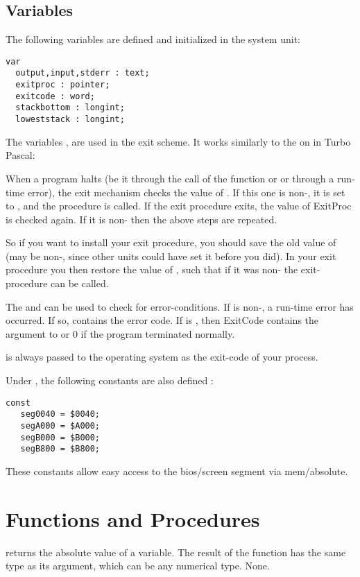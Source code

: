 \documentclass{report}
\begin{document}
\subsection{Variables}
The following variables are defined and initialized in the system unit:
\begin{verbatim}
var
  output,input,stderr : text;
  exitproc : pointer;
  exitcode : word;
  stackbottom : longint;
  loweststack : longint;
\end{verbatim}
The variables ,  are used in the \fpc exit
scheme. It works similarly to the on in Turbo Pascal:

When a program halts (be it through the call of the  function or
 or through a run-time error), the exit mechanism checks the value
of . If this one is non-, it is set to , and
the procedure is called. If the exit procedure exits, the value of ExitProc
is checked again. If it is non- then the above steps are repeated.

So if you want to install your exit procedure, you should save the old value
of  (may be non-, since other units could have set it before 
you did). In your exit procedure you then restore the value of
, such that if it was non- the exit-procedure can be
called.

The  and  can be used to check for
error-conditions. If  is non-, a run-time error has
occurred. If so,  contains the error code. If  is
, then {ExitCode} contains the argument to  or 0 if the
program terminated normally.

 is always passed to the operating system as the exit-code of
your process.

Under , the following constants are also defined :
\begin{verbatim}
const
   seg0040 = $0040;
   segA000 = $A000;
   segB000 = $B000;
   segB800 = $B800;
\end{verbatim}
These constants allow easy access to the bios/screen segment via mem/absolute.

\section{Functions and Procedures}
{ returns the absolute value of a variable. The result of the
function has the same type as its argument, which can be any numerical
type.}
{None.}
{}
\end{document}
